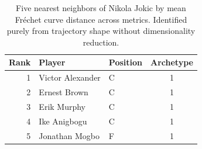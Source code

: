 \begin{table}[htbp]
  \centering\small
  \begin{tabular}{rllc}
    \toprule
    Rank & Player & Position & Archetype \\
    \midrule
    1 & Victor Alexander & C & 1 \\
    2 & Ernest Brown & C & 1 \\
    3 & Erik Murphy & C & 1 \\
    4 & Ike Anigbogu & C & 1 \\
    5 & Jonathan Mogbo & F & 1 \\
    \bottomrule
  \end{tabular}
  \caption{Five nearest neighbors of Nikola Jokic by mean Fr\'{e}chet curve distance across metrics. Identified purely from trajectory shape without dimensionality reduction.}
  \label{tab:Nikola_Jokic_frechet_curve_neighbors}
\end{table}

